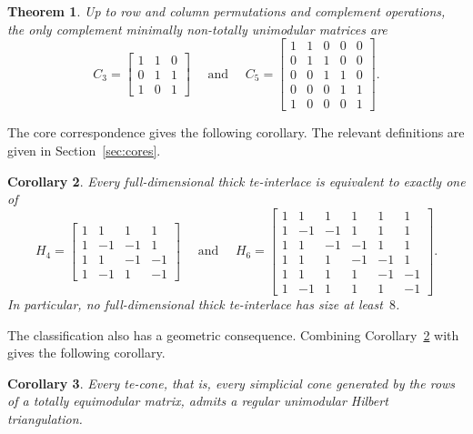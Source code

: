 \documentclass{amsart}
\newtheorem{theorem}{Theorem}[section]
\newtheorem{corollary}[theorem]{Corollary}
\numberwithin{equation}{section}
\newcommand{\wideand}{ \quad \text{ and } \quad }
\begin{document}
\begin{theorem}\label{thm:main}
Up to row and column permutations and complement operations, the only complement minimally non-totally unimodular matrices are
$$
    C_3=\begin{bmatrix}
        1 & 1 & 0\\
        0& 1 & 1\\
        1&0&1
    \end{bmatrix} \wideand
    C_5=\begin{bmatrix}
        1&1&0&0&0\\
        0&1&1&0&0\\
        0&0&1&1&0\\
        0&0&0&1&1\\
        1&0&0&0&1
    \end{bmatrix}.
$$
\end{theorem}

The core correspondence gives the following corollary.
The relevant definitions are given in Section~\ref{sec:cores}.

\begin{corollary}\label{cor:te-interlace}
Every full-dimensional thick te-interlace is equivalent to exactly one of
$$
    H_4= \begin{bmatrix}
        1&1&1&1\\
        1&-1&-1&1\\
        1&1&-1&-1\\
        1&-1&1&-1
    \end{bmatrix} \wideand
    H_6= \begin{bmatrix}
        1&1&1&1&1&1\\
        1&-1&-1&1&1&1\\
        1&1&-1&-1&1&1\\
        1&1&1&-1&-1&1\\
        1&1&1&1&-1&-1\\
        1&-1&1&1&1&-1
    \end{bmatrix}.
$$
In particular, no full-dimensional thick te-interlace has size at least~$8$.
\end{corollary}

The classification also has a geometric consequence.
Combining Corollary~\ref{cor:te-interlace} with \cite[Corollary~3.4 and Theorem~4.5]{Chervet_Grappe_Vallee_2026} gives the following corollary.

\begin{corollary}\label{cor:triangulation}
    Every te-cone, that is, every simplicial cone generated by the rows of a totally equimodular matrix, admits a regular unimodular Hilbert triangulation.
\end{corollary}
\end{document}

